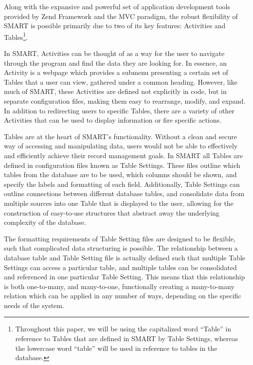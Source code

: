 \documentclass[12pt]{article}
\begin{document}
\newpage
Along with the expansive and powerful set of application development tools provided by Zend Framework and the MVC paradigm, the robust flexibility of SMART is possible primarily due to two of its key features: Activities and Tables\footnote{Throughout this paper, we will be using the capitalized word ``Table'' in reference to Tables that are defined in SMART by Table Settings, whereas the lowercase word ``table'' will be used in reference to tables in the database.}. 

In SMART, Activities can be thought of as a way for the user to navigate through the program and find the data they are looking for. In essence, an Activity is a webpage which provides a submenu presenting a certain set of Tables that a user can view, gathered under a common heading. However, like much of SMART, these Activities are defined not explicitly in code, but in separate configuration files, making them easy to rearrange, modify, and expand. In addition to redirecting users to specific Tables, there are a variety of other Activities that can be used to display information or fire specific actions. %

Tables are at the heart of SMART's functionality. Without a clean and secure way of accessing and manipulating data, users would not be able to effectively and efficiently achieve their record management goals. In SMART all Tables are defined in configuration files known as Table Settings. These files outline which tables from the database are to be used, which columns should be shown, and specify the labels and formatting of each field. Additionally, Table Settings can outline connections between different database tables, and consolidate data from multiple sources into one Table that is displayed to the user, allowing for the construction of easy-to-use structures that abstract away the underlying complexity of the database. %

The formatting requirements of Table Setting files are designed to be flexible, such that complicated data structuring is possible. The relationship between a database table and Table Setting file is actually defined such that multiple Table Settings can access a particular table, and multiple tables can be consolidated and referenced in one particular Table Setting. This means that this relationship is both one-to-many, and many-to-one, functionally creating a many-to-many relation which can be applied in any number of ways, depending on the specific needs of the system.
\end{document}
